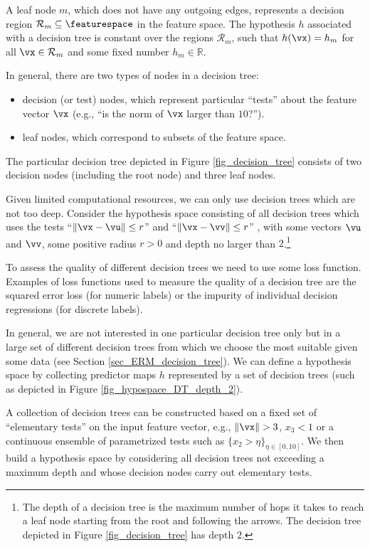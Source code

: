 \documentclass[12pt]{report}
\begin{document}
A leaf node $m$, which does not have any outgoing edges, 
represents a decision region $\mathcal{R}_{m} \subseteq \featurespace$ in 
the feature space. The hypothesis $h$ associated with a decision tree 
is constant over the regions $\mathcal{R}_{m}$, such that $h(\vx) = h_{m}$ 
for all $\vx \in \mathcal{R}_{m}$ and some fixed number $h_{m} \in \mathbb{R}$. 

In general, there are two types of nodes in a decision tree: 
\begin{itemize} 
\item decision (or test) nodes, which represent particular ``tests'' 
about the feature vector $\vx$ (e.g., ``is the norm of $\vx$ larger than $10$?'').
\item leaf nodes, which correspond to subsets of the feature space. 
\end{itemize} 
The particular decision tree depicted in Figure \ref{fig_decision_tree} consists 
of two decision nodes (including the root node) and three leaf nodes. 

Given limited computational resources, we can only use decision 
trees which are not too deep. Consider the hypothesis space consisting 
of all decision trees which uses the tests ``$\| \vx - \vu \| \leq r$'' and  
``$\| \vx - \vv \| \leq r$'' , with some vectors $\vu$ and $\vv$, some positive 
radius $r >0$ and depth no larger than $2$.\footnote{The depth of a decision tree 
	is the maximum number of hops it takes to reach a leaf node starting 
	from the root and following the arrows. The decision tree depicted in Figure \ref{fig_decision_tree} has depth $2$.} 

To assess the quality of different decision trees we need to use some 
loss function. Examples of loss functions used to measure the quality 
of a decision tree are the squared error loss (for numeric labels) or the 
impurity of individual decision regressions (for discrete labels). 

In general, we are not interested in one particular decision tree only but 
in a large set of different decision trees from which we choose the most 
suitable given some data (see Section \ref{sec_ERM_decision_tree}). We 
can define a hypothesis space by collecting predictor maps $h$ represented 
by a set of decision trees (such as depicted in Figure \ref{fig_hypospace_DT_depth_2}). 

A collection of decision trees can be constructed based on a fixed set of 
``elementary tests'' on the input feature vector, e.g., $\| \vx \| > 3$, $x_{3} < 1$ 
or a continuous ensemble of parametrized tests such as $\{ x_{2} > \eta \}_ {\eta \in [0,10]}$. 
We then build a hypothesis space by considering all decision trees not 
exceeding a maximum depth and whose decision nodes carry out 
elementary tests. 
\end{document}
